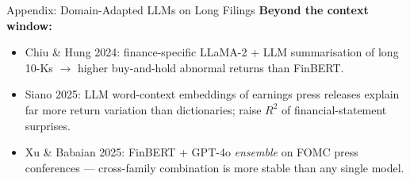 \documentclass[9pt,t]{beamer}
\begin{document}
\begin{frame}[noframenumbering]{Appendix: Domain-Adapted LLMs on Long Filings}
\textbf{Beyond the context window:}
\begin{itemize}\small
  \item Chiu \& Hung 2024: finance-specific LLaMA-2 + LLM summarisation of long
        10-Ks $\to$ higher buy-and-hold abnormal returns than FinBERT.
  \item Siano 2025: LLM word-context embeddings of earnings press releases
        explain far more return variation than dictionaries; raise $R^2$ of
        financial-statement surprises.
  \item Xu \& Babaian 2025: FinBERT + GPT-4o \emph{ensemble} on FOMC press
        conferences --- cross-family combination is more stable than any single model.
\end{itemize}
\end{frame}
\end{document}
